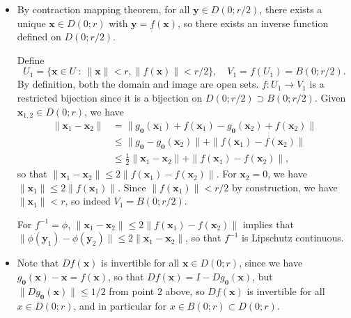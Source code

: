 \documentclass[letter-paper]{tufte-book}
\newenvironment{proof}[1][Proof]{\begin{trivlist}
\item[\hskip \labelsep {\bfseries #1}]}{\end{trivlist}}
\begin{document}
\begin{proof}
\begin{itemize}
    \item By contraction mapping theorem, for all $\boldsymbol{y} \in D(0; r/2)$,
    there exists a unique $\boldsymbol{x} \in D(0; r)$ with $\boldsymbol{y} =
    f(\boldsymbol{x})$, so there exists an inverse function defined on $D(0;
    r/2)$.
    
    Define
    \begin{equation*}
      U_1 = \{\boldsymbol{x} \in U\ :\ \|\boldsymbol{x}\| < r, \|f(\boldsymbol{x})\| < r/2\}, \quad V_1 = f(U_1) = B(0; r/2).
    \end{equation*}
    By definition, both the domain and image are open sets. $f : U_1 \to V_1$ is a
    restricted bijection since it is a bijection on $D(0; r/2) \supset B(0; r/2)$.
    Given $\boldsymbol{x}_{1,2} \in D(0; r)$, we have
    \begin{align*}
      \|\boldsymbol{x}_1 - \boldsymbol{x}_2\| &= \| g_{\boldsymbol{0}}(\boldsymbol{x}_1) + f(\boldsymbol{x}_1) - g_{\boldsymbol{0}}(\boldsymbol{x}_2) + f(\boldsymbol{x}_2)\| \\
        & \leq \|g_{\boldsymbol{0}} - g_{\boldsymbol{0}}(\boldsymbol{x}_2)\| + \|f(\boldsymbol{x}_1) - f(\boldsymbol{x}_2)\| \\
        & \leq \frac{1}{2} \|\boldsymbol{x}_1 - \boldsymbol{x}_2\| + \|f(\boldsymbol{x}_1) - f(\boldsymbol{x}_2)\|,
    \end{align*}
    so that $\|\boldsymbol{x}_1 - \boldsymbol{x}_2\| \leq 2\|f(\boldsymbol{x}_1) -
    f(\boldsymbol{x}_2)\|$. For $\boldsymbol{x}_2 = 0$, we have
    $\|\boldsymbol{x}_1\| \leq 2\|f(\boldsymbol{x}_1)\|$. Since
    $\|f(\boldsymbol{x}_1)\| < r/2$ by construction, we have $\|\boldsymbol{x}_1\|
    < r$, so indeed $V_1 = B(0; r/2)$.
    
    For $f^{-1} = \phi$, $\|\boldsymbol{x}_1 - \boldsymbol{x}_2\| \leq
    2\|f(\boldsymbol{x}_1) - f(\boldsymbol{x}_2)\|$ implies that
    $\|\phi(\boldsymbol{y}_1) - \phi(\boldsymbol{y}_2)\| \leq 2\|\boldsymbol{x}_1
    - \boldsymbol{x}_2\|$, so that $f^{-1}$ is Lipschutz continuous.
    
    \item Note that $Df(\boldsymbol{x})$ is invertible for all $\boldsymbol{x}
    \in D(0; r)$, since we have $g_{\boldsymbol{0}}(\boldsymbol{x}) -
    \boldsymbol{x} = f(\boldsymbol{x})$, so that $Df(\boldsymbol{x}) = I -
    Dg_{\boldsymbol{0}}(\boldsymbol{x})$, but
    $\|Dg_{\boldsymbol{0}}(\boldsymbol{x})\| \leq 1/2$ from point 2 above, so
    $Df(\boldsymbol{x})$ is invertible for all $x \in D(0;r)$, and in particular
    for $x \in B(0; r) \subset D(0; r)$.
    

\end{itemize}
\end{proof}
\end{document}
